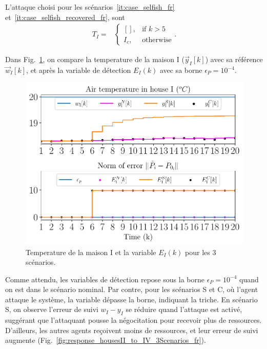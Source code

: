 \documentclass[../main.tex]{subfiles}
\begin{document}
L'attaque choisi pour les scénarios~\ref{it:case_selfish_fr} et~\ref{it:case_selfish_recovered_fr},
sont
\begin{align}
  T_{I}=&\begin{cases}
          \left[\right],&\text{if }k> 5\\
          I_{c},&\text{otherwise}
        \end{cases}
.
\end{align}
\pagebreak

Dans Fig.~\ref{fig:response_houseI_3Scenarios_fr}, on compare la temperature de la maison I ($\vec{y}_{I}[k]$) avec sa référence $\vec{w}_{I}[k]$, et après la variable de détection ${E_{I}(k)}$ avec sa borne $\epsilon_{P}=10^{-4}$.

\begin{figure}[h]
  \centering
  \includegraphics[width=.65\textwidth]{../img/resilient_eq/ErrorWX_command_normErrH.pdf}
\caption{Temperature de la maison I et la variable $E_{I}(k)$ pour les 3 scénarios.}\label{fig:response_houseI_3Scenarios_fr}
\end{figure}
Comme attendu, les variables de détection repose sous la borne $\epsilon_{P}=10^{-4}$ quand on est dans le scénario nominal.
Par contre, pour les scénarios S et C, où l'agent attaque le système, la variable dépasse la borne, indiquant la triche.
En scénario S, on observe l'erreur de suivi ${w_{I}-y_{I}}$ se réduire quand l'attaque est activé, suggérant que l'attaquant pousse la négocitation pour recevoir plus de ressources.
D'ailleurs, les autres agents reçoivent moins de ressources, et leur erreur de suivi augmente (Fig.~\ref{fig:response_housesII_to_IV_3Scenarios_fr}).
\end{document}
